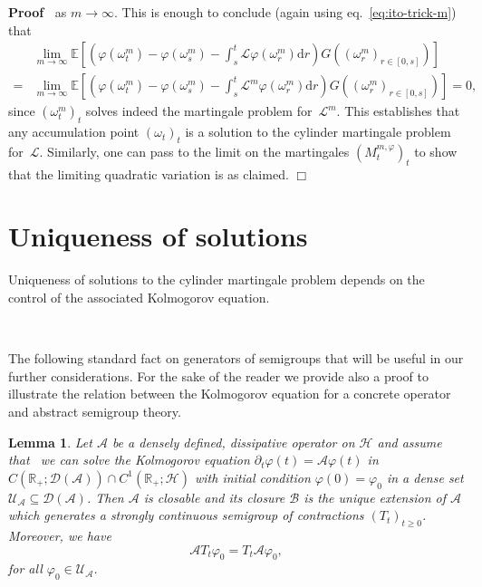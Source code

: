 \documentclass{article}
\newcommand{\mathd}{\mathrm{d}}
\newenvironment{proof}{\noindent\textbf{Proof\ }}{\hspace*{\fill}$\Box$\medskip}
\newtheorem{lemma}{Lemma}
\begin{document}
\begin{proof}
  as $m \rightarrow \infty$. This is enough to conclude (again using
  eq.~{\eqref{eq:ito-trick-m}}) that
  \[ \begin{array}{ll}
       & \lim_{m \rightarrow \infty} \mathbb{E} \left[ \left( \varphi
       (\omega_t^m) - \varphi (\omega_s^m) - \int_s^t \mathcal{L} \varphi
       (\omega_r^m) \mathd r \right) G ((\omega_r^m)_{r \in [0, s]}) \right]\\
       = & \lim_{m \rightarrow \infty} \mathbb{E} \left[ \left( \varphi
       (\omega_t^m) - \varphi (\omega_s^m) - \int_s^t \mathcal{L}^m \varphi
       (\omega_r^m) \mathd r \right) G ((\omega_r^m)_{r \in [0, s]}) \right] =
       0,
     \end{array} \]
  since $(\omega^m_t)_t$ solves indeed the martingale problem
  for~$\mathcal{L}^m$. This establishes that any accumulation point
  $(\omega_t)_t$ is a solution to the cylinder martingale problem
  for~$\mathcal{L}$. Similarly, one can pass to the limit on the martingales
  $(M_t^{m, \varphi})_t$ to show that the limiting quadratic variation is as
  claimed.
\end{proof}

\section{Uniqueness of solutions}\label{sec:uniq}

Uniqueness of solutions to the cylinder martingale problem depends on the
control of the associated Kolmogorov equation.

\

The following standard fact on generators of semigroups that will be useful
in our further considerations. For the sake of the reader we provide also a
proof to illustrate the relation between the Kolmogorov equation for a
concrete operator and abstract semigroup theory.

\begin{lemma}
  \label{lemma:closure}Let $\mathcal{A}$ be a densely defined, dissipative
  operator on $\mathcal{H}$ and assume that \ we can solve the Kolmogorov
  equation $\partial_t \varphi (t) =\mathcal{A} \varphi (t)$ in $C
  (\mathbb{R}_+ ; \mathcal{D} (\mathcal{A})) \cap C^1 (\mathbb{R}_+ ;
  \mathcal{H})$ with initial condition $\varphi (0) = \varphi_0$ in a dense
  set $\mathcal{U}_{\mathcal{A}} \subseteq \mathcal{D} (\mathcal{A})$. Then
  $\mathcal{A}$ is closable and its closure $\mathcal{B}$ is the unique
  extension of $\mathcal{A}$ which generates a strongly continuous semigroup
  of contractions $(T_t)_{t \geqslant 0}$. Moreover, we have
  \begin{equation}
    \mathcal{A}T_t \varphi_0 = T_t \mathcal{A} \varphi_0, \label{eq:kolm-aa}
  \end{equation}
  for all $\varphi_0 \in \mathcal{U}_{\mathcal{A}}$.
\end{lemma}
\end{document}
